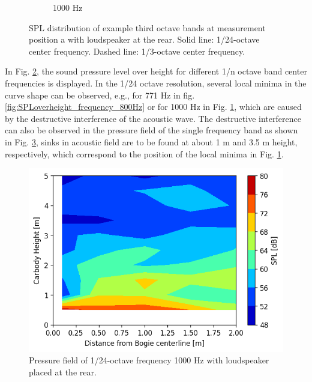 \begin{figure}[H]
\begin{subfigure}[b]{0.48\textwidth}
        \caption{1000 Hz}
        \label{fig:SPLoverheight_frequency_1000Hz}
    \end{subfigure}
    \caption{SPL distribution of example third octave bands at measurement position a with loudspeaker at the rear. Solid line: 1/24-octave center frequency. Dashed line: 1/3-octave center frequency.}
    \label{fig:SPLoverheight_frequency}
\end{figure}

\noindent In Fig. \ref{fig:SPLoverheight_frequency}, the sound pressure level over height for different 1/n octave band center frequencies is displayed. In the 1/24 octave resolution, several local minima in the curve shape can be observed, e.g., for 771 Hz in fig. \ref{fig:SPLoverheight_frequency_800Hz} or for 1000 Hz in Fig. \ref{fig:SPLoverheight_frequency_1000Hz}, which are caused by the destructive interference of the acoustic wave. The destructive interference can also be observed in the pressure field of the single frequency band as shown in Fig. \ref{fig:pressurefield_1000Hz}, sinks in acoustic field are to be found at about 1 m and 3.5 m height, respectively, which correspond to the position of the local minima in Fig. \ref{fig:SPLoverheight_frequency_1000Hz}.

\begin{figure}[H]
    \centering
    \includegraphics[width=0.6\linewidth]{fig/pressure_field_1000Hz.png}
    \caption{Pressure field of 1/24-octave frequency 1000 Hz with loudspeaker placed at the rear.}
    \label{fig:pressurefield_1000Hz}
\end{figure}
